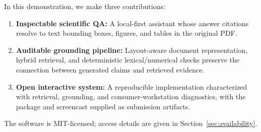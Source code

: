 In this demonstration, we make three contributions:
\begin{enumerate}
    \item \textbf{Inspectable scientific QA:} A local-first assistant whose answer citations resolve to text bounding boxes, figures, and tables in the original PDF.
    \item \textbf{Auditable grounding pipeline:} Layout-aware document representation, hybrid retrieval, and deterministic lexical/numerical checks preserve the connection between generated claims and retrieved evidence.
    \item \textbf{Open interactive system:} A reproducible implementation characterized with retrieval, grounding, and consumer-workstation diagnostics, with the package and screencast supplied as submission artifacts.
\end{enumerate}

The software is MIT-licensed; access details are given in Section~\ref{sec:availability}.
